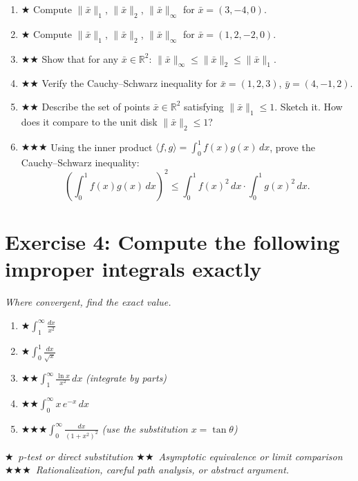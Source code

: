 \documentclass[12pt,a4paper]{article}
\newcommand{\easy}{{\color{green!60!black}$\bigstar$}}
\newcommand{\medium}{{\color{orange}$\bigstar\bigstar$}}
\newcommand{\hard}{{\color{red}$\bigstar\bigstar\bigstar$}}
\begin{document}
\begin{enumerate}[leftmargin=*, label=(\alph*)]

\item \easy\quad
Compute $\|\bar{x}\|_1$, $\|\bar{x}\|_2$, $\|\bar{x}\|_\infty$ for $\bar{x}=(3,-4,0)$.

\item \easy\quad
Compute $\|\bar{x}\|_1$, $\|\bar{x}\|_2$, $\|\bar{x}\|_\infty$ for $\bar{x}=(1,2,-2,0)$.

\item \medium\quad
Show that for any $\bar{x}\in\mathbb{R}^2$:
$\|\bar{x}\|_\infty \le \|\bar{x}\|_2 \le \|\bar{x}\|_1$.

\item \medium\quad
Verify the Cauchy--Schwarz inequality for
$\bar{x}=(1,2,3)$, $\bar{y}=(4,-1,2)$.

\item \medium\quad
Describe the set of points $\bar{x}\in\mathbb{R}^2$ satisfying $\|\bar{x}\|_1 \le 1$.
Sketch it. How does it compare to the unit disk $\|\bar{x}\|_2 \le 1$?

\item \hard\quad
Using the inner product $\langle f,g\rangle=\int_0^1 f(x)g(x)\,dx$,
prove the Cauchy--Schwarz inequality:
\[
\left(\int_0^1 f(x)g(x)\,dx\right)^2
\le \int_0^1 f(x)^2\,dx\cdot\int_0^1 g(x)^2\,dx.
\]

\end{enumerate}

\section*{Exercise 4: Compute the following improper integrals exactly}

\emph{Where convergent, find the exact value.}

\begin{enumerate}[leftmargin=*, label=(\alph*)]

\item \easy\quad $\displaystyle\int_1^{\infty}\frac{dx}{x^2}$

\item \easy\quad $\displaystyle\int_0^{1}\frac{dx}{\sqrt{x}}$

\item \medium\quad $\displaystyle\int_1^{\infty}\frac{\ln x}{x^2}\,dx$
\quad\emph{(integrate by parts)}

\item \medium\quad $\displaystyle\int_0^{\infty} x\,e^{-x}\,dx$

\item \hard\quad $\displaystyle\int_0^{\infty}\frac{dx}{(1+x^2)^2}$
\quad\emph{(use the substitution $x=\tan\theta$)}

\end{enumerate}

\bigskip
\begin{center}
\small\itshape
\easy\ $p$-test or direct substitution\quad
\medium\ Asymptotic equivalence or limit comparison\quad
\hard\ Rationalization, careful path analysis, or abstract argument.
\end{center}
\end{document}
